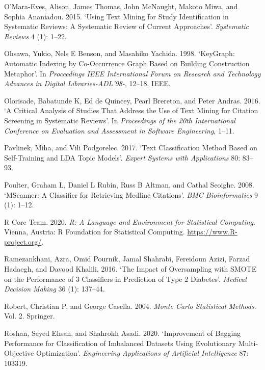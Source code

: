 \documentclass{article}
\newlength{\cslhangindent}
\newlength{\cslentryspacingunit} %
\newenvironment{CSLReferences}[2] %
 {%
  \setlength{\parindent}{0pt}
  \ifodd #1
  \let\oldpar\par
  \def\par{\hangindent=\cslhangindent\oldpar}
  \fi
  \setlength{\parskip}{#2\cslentryspacingunit}
 }%
 {}
\begin{document}
\begin{CSLReferences}{1}{0}
\leavevmode{}%
O'Mara-Eves, Alison, James Thomas, John McNaught, Makoto Miwa, and
Sophia Ananiadou. 2015. {`Using Text Mining for Study Identification in
Systematic Reviews: A Systematic Review of Current Approaches'}.
\emph{Systematic Reviews} 4 (1): 1--22.

\leavevmode{}%
Ohsawa, Yukio, Nels E Benson, and Masahiko Yachida. 1998. {`KeyGraph:
Automatic Indexing by Co-Occurrence Graph Based on Building Construction
Metaphor'}. In \emph{Proceedings IEEE International Forum on Research
and Technology Advances in Digital Libraries-ADL'98-}, 12--18. IEEE.

\leavevmode{}%
Olorisade, Babatunde K, Ed de Quincey, Pearl Brereton, and Peter Andras.
2016. {`A Critical Analysis of Studies That Address the Use of Text
Mining for Citation Screening in Systematic Reviews'}. In
\emph{Proceedings of the 20th International Conference on Evaluation and
Assessment in Software Engineering}, 1--11.

\leavevmode{}%
Pavlinek, Miha, and Vili Podgorelec. 2017. {`Text Classification Method
Based on Self-Training and LDA Topic Models'}. \emph{Expert Systems with
Applications} 80: 83--93.

\leavevmode{}%
Poulter, Graham L, Daniel L Rubin, Russ B Altman, and Cathal Seoighe.
2008. {`MScanner: A Classifier for Retrieving Medline Citations'}.
\emph{BMC Bioinformatics} 9 (1): 1--12.

\leavevmode{}%
R Core Team. 2020. \emph{R: A Language and Environment for Statistical
Computing}. Vienna, Austria: R Foundation for Statistical Computing.
\url{https://www.R-project.org/}.

\leavevmode{}%
Ramezankhani, Azra, Omid Pournik, Jamal Shahrabi, Fereidoun Azizi,
Farzad Hadaegh, and Davood Khalili. 2016. {`The Impact of Oversampling
with SMOTE on the Performance of 3 Classifiers in Prediction of Type 2
Diabetes'}. \emph{Medical Decision Making} 36 (1): 137--44.

\leavevmode{}%
Robert, Christian P, and George Casella. 2004. \emph{Monte Carlo
Statistical Methods}. Vol. 2. Springer.

\leavevmode{}%
Roshan, Seyed Ehsan, and Shahrokh Asadi. 2020. {`Improvement of Bagging
Performance for Classification of Imbalanced Datasets Using Evolutionary
Multi-Objective Optimization'}. \emph{Engineering Applications of
Artificial Intelligence} 87: 103319.


\end{CSLReferences}
\end{document}
